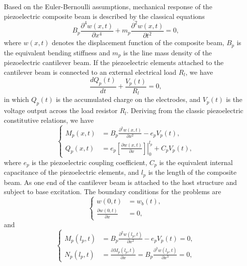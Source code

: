 \documentclass{article}
\begin{document}
Based on the Euler-Bernoulli assumptions, mechanical response of the piezoelectric composite beam is described by the classical equations
\begin{equation}
    B_p \frac{\partial^4 w(x,t)}{\partial x^4} + m_p \frac{\partial^2 w(x,t)}{\partial t^2} = 0,
\end{equation}
where $w(x,t)$ denotes the displacement function of the composite beam, $B_p$ is the equivalent bending stiffness and $m_p$ is the line mass density of the piezoelectric cantilever beam. If the piezoelectric elements attached to the cantilever beam is connected to an external electrical load $R_l$, we have 
\begin{equation}
    \frac{d Q_p(t)}{d t} + \frac{V_p(t)}{R_l} = 0,
\end{equation}
in which $Q_p(t)$ is the accumulated charge on the electrodes, and $V_p(t)$ is the voltage output across the load resistor $R_l$. Deriving from the classic piezoelectric constitutive relations, we have 
\begin{equation}
    \left\{\begin{aligned}
        M_p(x,t) &= B_p \frac{\partial^2 w(x,t)}{\partial x^2} - e_p V_p(t), \\
        Q_p(x,t) &= e_p \left.\left[ \frac{\partial w(x,t)}{\partial x} \right]\right|_0^{l_p} + C_p V_p(t),
    \end{aligned}\right.
\end{equation}
where $e_p$ is the piezoelectric coupling coefficient, $C_p$ is the equivalent internal capacitance of the piezoelectric elements, and $l_p$ is the length of the composite beam. As one end of the cantilever beam is attached to the host structure and subject to base excitation. The boundary conditions for the problems are 
\begin{equation}
    \left\{\begin{aligned}
        w(0,t) &= w_b(t), \\
        \frac{\partial w(0,t)}{\partial x} &= 0,
    \end{aligned}\right.
\end{equation}
and
\begin{equation}
    \left\{\begin{aligned}
        M_p(l_p,t) &= B_p \frac{\partial^2 w(l_p,t)}{\partial x^2} - e_p V_p(t) = 0, \\
        N_p(l_p,t) &= \frac{\partial M_p(l_p,t)}{\partial x} = B_p \frac{\partial^3 w(l_p,t)}{\partial x^3} = 0,
    \end{aligned}\right.
\end{equation}
\end{document}

